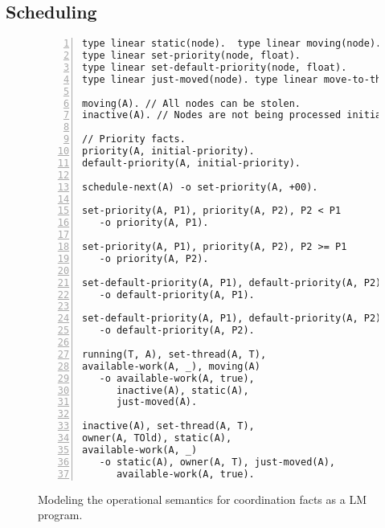 \subsection{Scheduling}

\begin{figure}[h!]
\begin{Verbatim}[numbers=left,fontsize=\codesize,commandchars=*\#\&]
type linear static(node).  type linear moving(node).
type linear set-priority(node, float).
type linear set-default-priority(node, float).
type linear just-moved(node). type linear move-to-thread(node, thread).

moving(A). // All nodes can be stolen.
inactive(A). // Nodes are not being processed initially.

// Priority facts.
priority(A, initial-priority).
default-priority(A, initial-priority).

schedule-next(A) -o set-priority(A, +00).

set-priority(A, P1), priority(A, P2), P2 < P1
   -o priority(A, P1).

set-priority(A, P1), priority(A, P2), P2 >= P1
   -o priority(A, P2).

set-default-priority(A, P1), default-priority(A, P2), P2 < P1
   -o default-priority(A, P1).

set-default-priority(A, P1), default-priority(A, P2), P2 >= P1
   -o default-priority(A, P2).

running(T, A), set-thread(A, T),
available-work(A, _), moving(A)
   -o available-work(A, true),
      inactive(A), static(A),
      just-moved(A).

inactive(A), set-thread(A, T),
owner(A, TOld), static(A),
available-work(A, _)
   -o static(A), owner(A, T), just-moved(A),
      available-work(A, true).
\end{Verbatim}
\caption{Modeling the operational semantics for coordination facts as a LM program.}
\label{code:threads:modeling_scheduling}
\end{figure}
